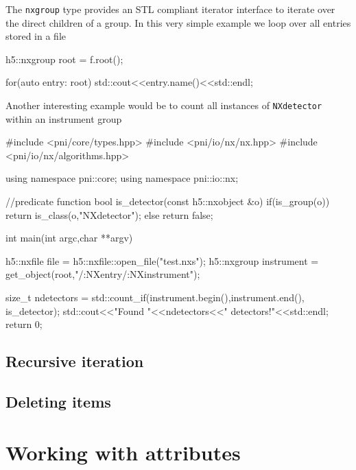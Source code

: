 The {\tt nxgroup} type provides an STL compliant iterator interface to iterate
over the direct children of a group. In this very simple example we loop over 
all entries stored in a file
\begin{cppcode}
h5::nxgroup root = f.root();

for(auto entry: root)
    std::cout<<entry.name()<<std::endl;
\end{cppcode}
Another interesting example would be to count all instances of {\tt NXdetector} 
within an instrument group
\begin{cppcode}
#include <pni/core/types.hpp>
#include <pni/io/nx/nx.hpp>
#include <pni/io/nx/algorithms.hpp>

using namespace pni::core;
using namespace pni::io::nx;

//predicate function
bool is_detector(const h5::nxobject &o)
{
    if(is_group(o)) return is_class(o,"NXdetector");
    else return false;
}

int main(int argc,char **argv)
{
    h5::nxfile file = h5::nxfile::open_file("test.nxs");
    h5::nxgroup instrument = get_object(root,"/:NXentry/:NXinstrument");

    size_t ndetectors = std::count_if(instrument.begin(),instrument.end(),
                                      is_detector);
    std::cout<<"Found "<<ndetectors<<" detectors!"<<std::endl;
    return 0;
}
\end{cppcode}

\subsection{Recursive iteration}

\subsection{Deleting items}



\section{Working with attributes}


